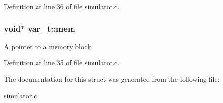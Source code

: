Definition at line 36 of file simulator.\-c.

\hypertarget{structvar__t_a10c34ec2d6e86f971cf9702a4651267d}{
\subsubsection[{mem}]{\setlength{\rightskip}{0pt plus 5cm}void$\ast$ var\-\_\-t\-::mem}}\label{structvar__t_a10c34ec2d6e86f971cf9702a4651267d}


A pointer to a memory block. 



Definition at line 35 of file simulator.\-c.



The documentation for this struct was generated from the following file\-:\begin{DoxyCompactItemize}
\item 
\hyperlink{simulator_8c}{simulator.\-c}\end{DoxyCompactItemize}
